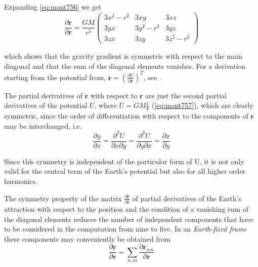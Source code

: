 Expanding \ref{eq:mont756} we get
\begin{equation}
  \label{eq:mont757}
  \frac{\partial \ddot{\bm{r}}}{\partial \bm{r}} =
    \frac{GM}{r^5}
      \begin{pmatrix}
        3 x^2 - r^2 & 3xy         & 3xz \\
        3yx         & 3 y^2 - r^2 & 3yz \\
        3zx         & 3zy         & 3 z^2 - r^2
      \end{pmatrix}
\end{equation}

which shows that the gravity gradient is symmetric with respect to the main diagonal
and that the sum of the diagonal elements vanishes. For a derivation starting from 
the potential from, 
$\ddot{\bm{r}} = \left( \frac{\partial U}{\partial \bm{r}} \right) ^T$,
see \cite{Montenbruck2000}.

The partial derivatives of $\ddot{\bm{r}}$ with respect to $\bm{r}$ are just the 
second partial derivatives of the potential $U$, where $U=GM\frac{1}{\bm{r}}$ 
(\ref{eq:mont757}), which are clearly symmetric, since the order of 
differentiation with respect to the components of $\bm{r}$ may be interchanged, 
i.e. \cite{Montenbruck2000}
\begin{equation}
  \label{eq:mont760}
  \frac{\partial \ddot{y}}{\partial x} = 
  \frac{\partial ^2 U}{\partial x \partial y} =
  \frac{\partial ^2 U}{\partial y \partial x} = 
  \frac{\partial \ddot{x}}{\partial y}
\end{equation}

Since this symmetry is independent of the particular form of U, it is not only valid
for the central term of the Earth's potential but also for all higher order harmonics.

The symmetry property of the matrix $\frac{\partial \ddot{\bm{r}}}{\partial \bm{r}}$ 
of partial derivatives of the Earth's attraction with respect to the position 
and the condition of a vanishing sum of the diagonal elements reduces the number 
of independent components that have to be considered in the computation from 
nine to five. In an \emph{Earth-fixed frame} these components may conveniently be 
obtained from
\begin{equation}
  \label{eq:mont764}
  \frac{\partial \ddot{\bm{r}}}{\partial \bm{r}} = 
    \sum_{n,m} \frac{\partial \ddot{\bm{r}_{nm}}}{\partial \bm{r}}
\end{equation}

